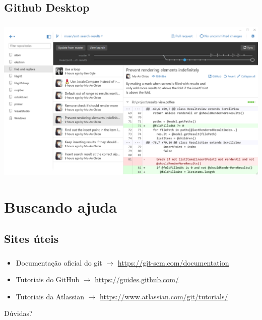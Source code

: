 \documentclass[aspectratio=169]{beamer}
\makeatletter
\newcommand*{\currentname}{\@currentlabelname}
\makeatother
\begin{document}
\subsection{Github Desktop}
\begin{frame}
  \frametitle{\currentname}
  \begin{center}
    \includegraphics[height=0.6\textheight]{img/github-desktop.png}
  \end{center}
\end{frame}

\section{Buscando ajuda}
\subsection{Sites úteis}
\begin{frame}
  \frametitle{\currentname}
  \begin{itemize}
    \item Documentação oficial do git $\rightarrow$ \href{https://git-scm.com/documentation}{https://git-scm.com/documentation}
    \item Tutoriais do GitHub $\rightarrow$ \href{https://guides.github.com/}{https://guides.github.com/}
    \item Tutoriais da Atlassian $\rightarrow$ \href{https://www.atlassian.com/git/tutorials/}{https://www.atlassian.com/git/tutorials/}
  \end{itemize}
\end{frame}

\begin{frame}
  \begin{center}
    {\Huge Dúvidas?}
  \end{center}
\end{frame}
\end{document}
